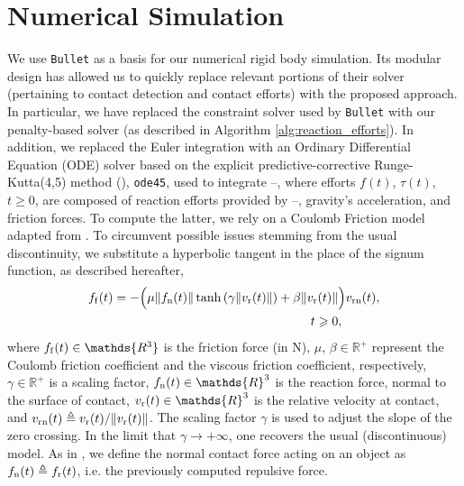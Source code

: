 \section{Numerical Simulation}\label{sec:simulation}
%
We use \texttt{Bullet} as a basis for our numerical rigid body simulation. Its modular design has allowed us to quickly replace relevant portions of their solver (pertaining to contact detection and contact efforts) with the proposed approach. In particular, we have replaced the constraint solver used by \texttt{Bullet} with our penalty-based solver (as described in Algorithm \ref{alg:reaction_efforts}). In addition, we replaced the Euler integration with an Ordinary Differential Equation (ODE) solver based on the explicit predictive-corrective Runge-Kutta(4,5) method (\cite{dormand1980family}), \texttt{ode45}, used to integrate --, where efforts $f(t)$, $\tau(t)$, $t\geqslant0$, are composed of reaction efforts provided by --, gravity's acceleration, and friction forces. To compute the latter, we rely on a Coulomb Friction model adapted from \cite{liu2015experimental}. To circumvent possible issues stemming from the usual discontinuity, we substitute a hyperbolic tangent in the place of the signum function, as described hereafter,
%
\begin{align}
	f_{\rm f}(t) = -\Big( \mu \|f_{\rm n}(t)\| \tanh \left(\gamma\|v_{\text{r}}(t)\| \right) + \beta \|v_{\rm r}(t)\|&\Big) v_{\rm rn}(t), \nonumber \\
	t\geqslant0&,
\end{align}
%
\noindent where $f_{\rm f}(t) \in \mathds{R^3}$ is the friction force (in N), $\mu$, $\beta \in \mathds{R^+}$ represent the Coulomb friction coefficient and the viscous friction coefficient, respectively, $\gamma \in \mathds R^+$ is a scaling factor, $f_{\rm n}(t)\in \mathds{R}^3$ is the reaction force, normal to the surface of contact, $v_{\rm r}(t) \in \mathds{R}^3$ is the relative velocity at contact, and $v_{\rm rn}(t)\triangleq v_{\rm r}(t) /\|v_{\rm r}(t) \|$. The scaling factor $\gamma$ is used to adjust the slope of the zero crossing. In the limit that $\gamma\rightarrow+\infty$, one recovers the usual (discontinuous) model. As in \cite{keller1994}, we define the normal contact force acting on an object as $f_{\rm n}(t) \triangleq f_{\rm r}(t)$, i.e. the previously computed repulsive force.

